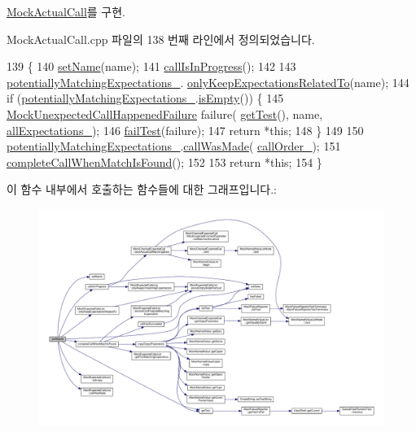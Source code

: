 \hyperlink{class_mock_actual_call_a183802278da5087fb62bbdcca7792e36}{Mock\+Actual\+Call}를 구현.



Mock\+Actual\+Call.\+cpp 파일의 138 번째 라인에서 정의되었습니다.


\begin{DoxyCode}
139 \{
140     \hyperlink{class_mock_checked_actual_call_a78091e2f29ee18ffda3ad24165e73f51}{setName}(name);
141     \hyperlink{class_mock_checked_actual_call_a60fd1e06699e3f79444c4e7f8055ac4a}{callIsInProgress}();
142 
143     \hyperlink{class_mock_checked_actual_call_a4fc6bec7509ed6eb28096956758c030a}{potentiallyMatchingExpectations\_}.
      \hyperlink{class_mock_expected_calls_list_a108af446766baeaec398000b6a4fd418}{onlyKeepExpectationsRelatedTo}(name);
144     \textcolor{keywordflow}{if} (\hyperlink{class_mock_checked_actual_call_a4fc6bec7509ed6eb28096956758c030a}{potentiallyMatchingExpectations\_}.\hyperlink{class_mock_expected_calls_list_a479432127ee77145cc19d6a2d1590821}{isEmpty}()) \{
145         \hyperlink{class_mock_unexpected_call_happened_failure}{MockUnexpectedCallHappenedFailure} failure(
      \hyperlink{class_mock_checked_actual_call_aa10112b41f7ed20162b12633042bb775}{getTest}(), name, \hyperlink{class_mock_checked_actual_call_aed217603c4a32c8f55a3087ac4a64a78}{allExpectations\_});
146         \hyperlink{class_mock_checked_actual_call_a275e824525aa26cb8874437442cdc186}{failTest}(failure);
147         \textcolor{keywordflow}{return} *\textcolor{keyword}{this};
148     \}
149 
150     \hyperlink{class_mock_checked_actual_call_a4fc6bec7509ed6eb28096956758c030a}{potentiallyMatchingExpectations\_}.\hyperlink{class_mock_expected_calls_list_a6e2b7989a09a51036edbafebda0e012a}{callWasMade}(
      \hyperlink{class_mock_checked_actual_call_a9c2547cfdee90cd355837413e7cf0760}{callOrder\_});
151     \hyperlink{class_mock_checked_actual_call_aae5ca9ab18e1a3a03ab292e825e2ece6}{completeCallWhenMatchIsFound}();
152 
153     \textcolor{keywordflow}{return} *\textcolor{keyword}{this};
154 \}
\end{DoxyCode}


이 함수 내부에서 호출하는 함수들에 대한 그래프입니다.\+:
\nopagebreak
\begin{figure}[H]
\begin{center}
\leavevmode
\includegraphics[width=350pt]{class_mock_checked_actual_call_ae7c89b622276a3b97f7fa58deeaf110b_cgraph}
\end{center}
\end{figure}




